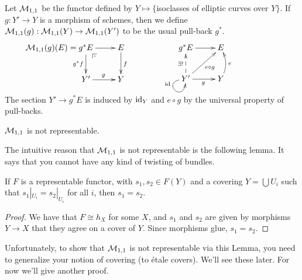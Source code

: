 \begin{example}
  Let $\mathcal{M}_{1,1}$ be the functor defined by $Y\mapsto \{$isoclasses of elliptic curves
  over $Y\}$. If $g:Y'\to Y$ is a morphism of schemes, then we define
  $\mathcal{M}_{1,1}(g):\mathcal{M}_{1,1}(Y) \to \mathcal{M}_{1,1}(Y')$ to be the usual pull-back $g^*$.
  \[\xymatrix{
   \llap{$\M_{1,1}(g)(E)=\;$} g^* E \ar[r] \ar[d]_{g^*f} \ar@{}[dr]|(.25){\pb} & E\ar[d]^f\\
   Y'\ar[r]^g & Y
  }\qquad\qquad
  \xymatrix{
   g^* E \ar[r] & E\\
   Y' \ar@(l,d)_(.3)\id \ar[r]_g  \ar@{-->}[u]^{\exists!} \ar[ur]_{e\circ g}
   & Y \ar@/_/[u]_e
  }\]
  The section $Y'\to g^*E$ is induced by $\operatorname{id}_Y$ and $e\circ g$ by the universal
  property of pull-backs.
\end{example}
\begin{proposition}\label{lec01:M11notrep}
  $\mathcal{M}_{1,1}$ is not representable.
\end{proposition}
The intuitive reason that $\mathcal{M}_{1,1}$ is not representable is the following lemma. It
says that you cannot have any kind of twisting of bundles.
\begin{lemma}
  If $F$ is a representable functor, with $s_1,s_2\in F(Y)$ and a covering $Y=\bigcup
  U_i$ such that $s_1|_{U_i}=s_2|_{U_i}$ for all $i$, then $s_1=s_2$.
\end{lemma}
\begin{proof}
  We have that $F\cong h_X$ for some $X$, and $s_1$ and $s_2$ are given by morphisms $Y\to
  X$ that they agree on a cover of $Y$. Since morphisms glue, $s_1=s_2$.
\end{proof}
Unfortunately, to show that $\mathcal{M}_{1,1}$ is not representable via this Lemma, you need to
generalize your notion of covering (to \'etale covers). We'll see these later. For now
we'll give another proof.
